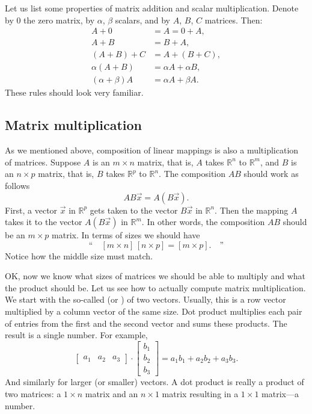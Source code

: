 Let us list some properties of matrix addition and scalar multiplication.
Denote by $0$ the zero matrix, by
$\alpha$, $\beta$ scalars, and by $A$, $B$, $C$ matrices.  Then:
\begin{align*}
A + 0 & = A = 0 + A , \\
A + B & = B + A , \\
(A + B) + C & = A + (B + C) , \\
\alpha(A+B) & = \alpha A+\alpha B, \\
(\alpha+\beta)A & = \alpha A + \beta A.
\end{align*}
These rules should look very familiar.

\subsection{Matrix multiplication}

As we mentioned above, composition of linear mappings is also a
multiplication of matrices.  Suppose $A$ is an $m \times n$ matrix,
that is, $A$ takes
${\mathbb R}^n$ to
${\mathbb R}^m$,
and $B$ is an $n \times p$ matrix, that is, $B$ takes
${\mathbb R}^p$ to
${\mathbb R}^n$.  The composition $AB$ should work as follows
\begin{equation*}
AB\vec{x} = A(B\vec{x}) .
\end{equation*}
First, a vector $\vec{x}$ in ${\mathbb R}^p$ gets taken to
the vector $B\vec{x}$ in
${\mathbb R}^n$.  Then the mapping $A$ takes it to the vector $A(B\vec{x})$
in ${\mathbb R}^m$.  In other words, the composition $AB$ should be an $m
\times p$ matrix.  In terms of sizes we should have
\begin{equation*}
\text{``}
\quad
[ m \times n ]
\,
[ n \times p ]
=
[ m \times p ] . \quad
\text{''}
\end{equation*}
Notice how the middle size must match.

OK\@, now we know what sizes of matrices we should be able to multiply
and what the product should be.
Let us see how to actually compute matrix multiplication.
We start with the so-called
\emph{} (or \emph{}) of two vectors.
Usually, this is a row vector multiplied
by a column vector of the same size.  Dot product multiplies
each pair of entries from the first and the second vector and sums these
products.  The result is a single number.
For example,
\begin{equation*}
\begin{bmatrix}
a_1 & a_2 & a_3
\end{bmatrix}
\cdot
\begin{bmatrix}
b_1 \\
b_2 \\
b_3
\end{bmatrix}
= a_1 b_1 + a_2 b_2 + a_3 b_3 .
\end{equation*}
And similarly for larger (or smaller) vectors.
A dot product is really a product of two matrices: a $1 \times n$ matrix
and an $n \times 1$ matrix resulting in
a $1 \times 1$ matrix---a number.

